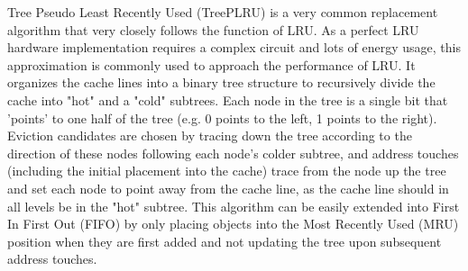 \documentclass[letterpaper, twocolumn]{article}
\begin{document}
Tree Pseudo Least Recently Used (TreePLRU) is a very common replacement algorithm that
very closely follows the function of LRU.
As a perfect LRU hardware implementation requires a complex circuit and lots of energy usage,
this approximation is commonly used to approach the performance of LRU.
It organizes the cache lines into a binary tree structure to recursively divide the cache
into "hot" and a "cold" subtrees.
Each node in the tree is a single bit that 'points' to one half of the tree
(e.g. 0 points to the left, 1 points to the right).
Eviction candidates are chosen by tracing down the tree according to the direction of these nodes
following each node's colder subtree,
and address touches (including the initial placement into the cache)
trace from the node up the tree and set each node to point away from the cache line,
as the cache line should in all levels be in the "hot" subtree.
This algorithm can be easily extended into First In First Out (FIFO)
by only placing objects into the Most Recently Used (MRU) position when they are first added
and not updating the tree upon subsequent address touches.
\end{document}
